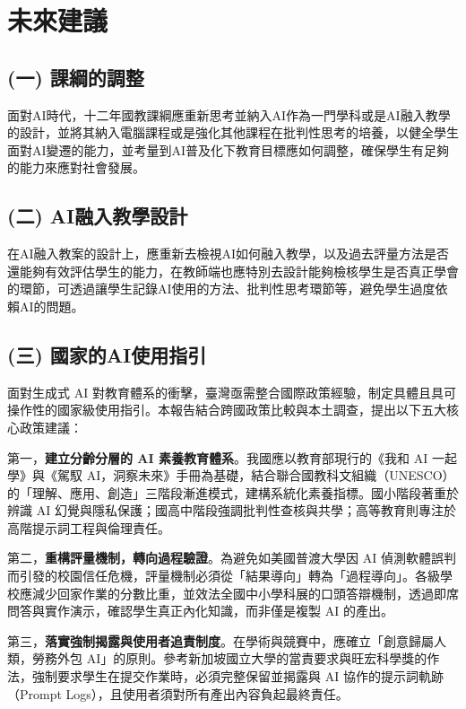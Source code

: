 \section{未來建議}\label{sec:未來建議}

\subsection{(一) 課綱的調整}\label{sec:未來建議一}

面對AI時代，十二年國教課綱應重新思考並納入AI作為一門學科或是AI融入教學的設計，並將其納入電腦課程或是強化其他課程在批判性思考的培養，以健全學生面對AI變遷的能力，並考量到AI普及化下教育目標應如何調整，確保學生有足夠的能力來應對社會發展。

\subsection{(二) AI融入教學設計}\label{sec:未來建議二}

在AI融入教案的設計上，應重新去檢視AI如何融入教學，以及過去評量方法是否還能夠有效評估學生的能力，在教師端也應特別去設計能夠檢核學生是否真正學會的環節，可透過讓學生記錄AI使用的方法、批判性思考環節等，避免學生過度依賴AI的問題。

\subsection{(三) 國家的AI使用指引}\label{sec:未來建議三}

面對生成式 AI 對教育體系的衝擊，臺灣亟需整合國際政策經驗，制定具體且具可操作性的國家級使用指引。本報告結合跨國政策比較與本土調查，提出以下五大核心政策建議：

第一，\textbf{建立分齡分層的 AI 素養教育體系}。我國應以教育部現行的《我和 AI 一起學》與《駕馭 AI，洞察未來》手冊為基礎\cite{govtw2024aiguide}，結合聯合國教科文組織（UNESCO）的「理解、應用、創造」三階段漸進模式\cite{unesco2024competency}，建構系統化素養指標。國小階段著重於辨識 AI 幻覺與隱私保護；國高中階段強調批判性查核與共學；高等教育則專注於高階提示詞工程與倫理責任。

第二，\textbf{重構評量機制，轉向過程驗證}。為避免如美國普渡大學因 AI 偵測軟體誤判而引發的校園信任危機\cite{arun2026ai}，評量機制必須從「結果導向」轉為「過程導向」。各級學校應減少回家作業的分數比重，並效法全國中小學科展的口頭答辯機制\cite{nehs2025science}，透過即席問答與實作演示，確認學生真正內化知識，而非僅是複製 AI 的產出。

第三，\textbf{落實強制揭露與使用者追責制度}。在學術與競賽中，應確立「創意歸屬人類，勞務外包 AI」的原則。參考新加坡國立大學的當責要求\cite{nus2024integrity}與旺宏科學獎的作法\cite{mxic2025competition}，強制要求學生在提交作業時，必須完整保留並揭露與 AI 協作的提示詞軌跡（Prompt Logs），且使用者須對所有產出內容負起最終責任。


